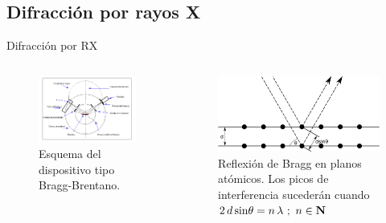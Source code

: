 \documentclass[11pt]{beamer}
\begin{document}
	\subsection{Difracción por rayos X}
		\begin{frame}{Difracción por RX}
			\begin{columns}
				\begin{column}{.54\textwidth}
					\begin{figure}[H]
						\centering
						\includegraphics[scale=0.4]{img/gonio.png}
						\caption*{Esquema del dispositivo tipo Bragg-Brentano.}
					\end{figure}
				\end{column}
				\begin{column}{.45\textwidth}
					\begin{figure}[H]
						\centering
						\includegraphics[scale=0.15]{img/Bragg.png}
						\caption*{Reflexión de Bragg en planos atómicos. Los picos de interferencia sucederán cuando  $2 \, d\, {\rm sin} \theta =n \, \lambda \, \,; \, \, n \in \mathbf{N}$}
					\end{figure}
				\end{column}
			\end{columns}
		\end{frame}
	
\end{document}
